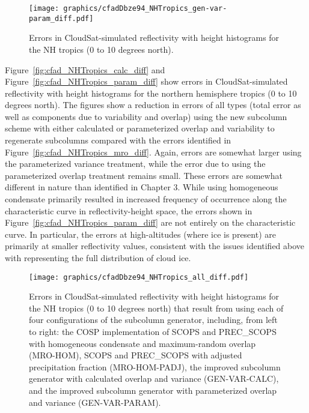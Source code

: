 \begin{figure}[tp]
\centering
\texttt{[image: graphics/cfadDbze94\_NHTropics\_gen-var-param\_diff.pdf]}
\caption{\label{fig:cfad_NHTropics_param_diff}Errors in
CloudSat-simulated reflectivity with height histograms for the NH
tropics (0 to 10 degrees
north).}\label{fig:cfadux5fNHTropicsux5fparamux5fdiff}
\end{figure}

Figure~\ref{fig:cfad_NHTropics_calc_diff} and
Figure~\ref{fig:cfad_NHTropics_param_diff} show errors in
CloudSat-simulated reflectivity with height histograms for the northern
hemisphere tropics (0 to 10 degrees north). The figures show a reduction
in errors of all types (total error as well as components due to
variability and overlap) using the new subcolumn scheme with either
calculated or parameterized overlap and variability to regenerate
subcolumns compared with the errors identified in
Figure~\ref{fig:cfad_NHTropics_mro_diff}. Again, errors are somewhat
larger using the parameterized variance treatment, while the error due
to using the parameterized overlap treatment remains small. These errors
are somewhat different in nature than identified in Chapter 3. While
using homogeneous condensate primarily resulted in increased frequency
of occurrence along the characteristic curve in reflectivity-height
space, the errors shown in Figure~\ref{fig:cfad_NHTropics_param_diff}
are not entirely on the characteristic curve. In particular, the errors
at high-altitudes (where ice is present) are primarily at smaller
reflectivity values, consistent with the issues identified above with
representing the full distribution of cloud ice.

\begin{figure}[tp]
\centering
\texttt{[image: graphics/cfadDbze94\_NHTropics\_all\_diff.pdf]}
\caption{\label{fig:cfad_NHTropics_all_diff}Errors in CloudSat-simulated
reflectivity with height histograms for the NH tropics (0 to 10 degrees
north) that result from using each of four configurations of the
subcolumn generator, including, from left to right: the COSP
implementation of SCOPS and PREC\_SCOPS with homogeneous condensate and
maximum-random overlap (MRO-HOM), SCOPS and PREC\_SCOPS with adjusted
precipitation fraction (MRO-HOM-PADJ), the improved subcolumn generator
with calculated overlap and variance (GEN-VAR-CALC), and the improved
subcolumn generator with parameterized overlap and variance
(GEN-VAR-PARAM).}\label{fig:cfadux5fNHTropicsux5fallux5fdiff}
\end{figure}

